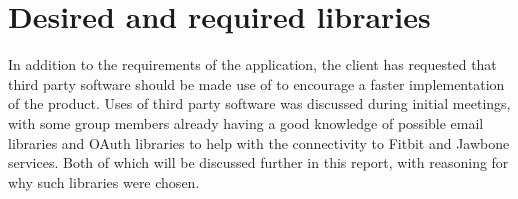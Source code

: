 \section{Desired and required libraries}
In addition to the requirements of the application, the client has requested that third party software should be made use of to encourage a faster implementation of the product. Uses of third party software was discussed during initial meetings, with some group members already having a good knowledge of possible email libraries and OAuth libraries to help with the connectivity to Fitbit and Jawbone services. Both of which will be discussed further in this report, with reasoning for why such libraries were chosen.